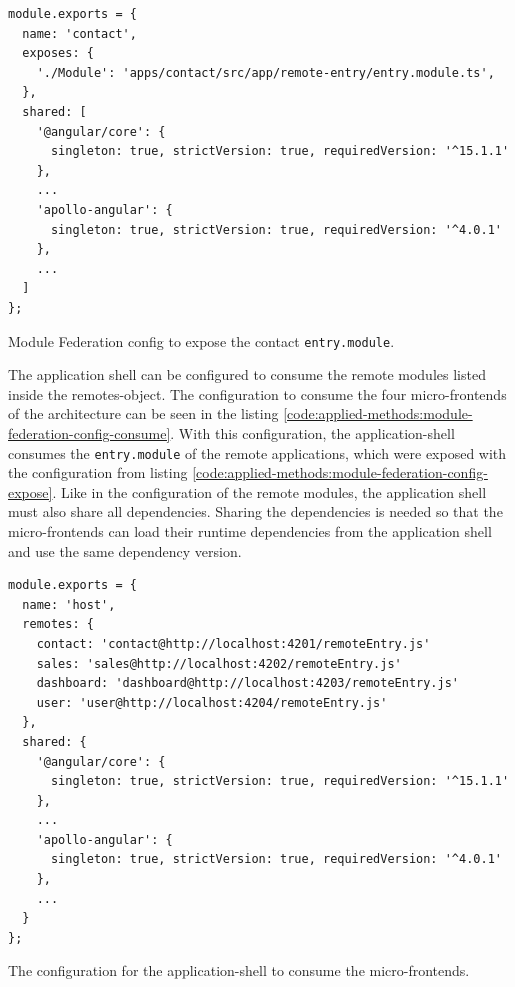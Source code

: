 \ifshowListings
\begin{listing}[H]
    \begin{verbatim}
module.exports = {
  name: 'contact',
  exposes: {
    './Module': 'apps/contact/src/app/remote-entry/entry.module.ts',
  },
  shared: [
    '@angular/core': {
      singleton: true, strictVersion: true, requiredVersion: '^15.1.1' 
    },
    ...
    'apollo-angular': { 
      singleton: true, strictVersion: true, requiredVersion: '^4.0.1' 
    },
    ...
  ]
};
    \end{verbatim}
    \caption{Module Federation config to expose the contact \texttt{entry.module}.}\label{code:applied-methods:module-federation-config-expose}
\end{listing}
\fi

\noindent The application shell can be configured to consume the remote modules listed inside the remotes-object. The configuration to consume the four micro-frontends of the architecture can be seen in the listing \ref{code:applied-methods:module-federation-config-consume}. With this configuration, the application-shell consumes the \texttt{entry.module} of the remote applications, which were exposed with the configuration from listing \ref{code:applied-methods:module-federation-config-expose}. Like in the configuration of the remote modules, the application shell must also share all dependencies. Sharing the dependencies is needed so that the micro-frontends can load their runtime dependencies from the application shell and use the same dependency version.

\ifshowListings
\begin{listing}[H]
    \begin{verbatim}
module.exports = {
  name: 'host',
  remotes: {
    contact: 'contact@http://localhost:4201/remoteEntry.js'
    sales: 'sales@http://localhost:4202/remoteEntry.js'
    dashboard: 'dashboard@http://localhost:4203/remoteEntry.js'
    user: 'user@http://localhost:4204/remoteEntry.js'
  },
  shared: {
    '@angular/core': {
      singleton: true, strictVersion: true, requiredVersion: '^15.1.1' 
    },
    ...
    'apollo-angular': { 
      singleton: true, strictVersion: true, requiredVersion: '^4.0.1' 
    },
    ...
  }
};
    \end{verbatim}
    \caption{The configuration for the application-shell to consume the micro-frontends.}\label{code:applied-methods:module-federation-config-consume}
\end{listing}
\fi

